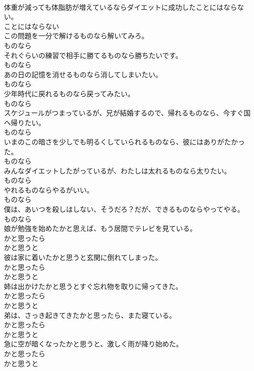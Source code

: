 \documentclass[8pt]{extreport}
\begin{document}
\begin{CJK}{UTF8}{min}
\\	体重が減っても体脂肪が増えているならダイエットに成功したことにはならない。	
\\	ことにはならない	
\\	この問題を一分で解けるものなら解いてみろ。	
\\	ものなら	
\\	それぐらいの練習で相手に勝てるものなら勝ちたいです。	
\\	ものなら	
\\	あの日の記憶を消せるものなら消してしまいたい。	
\\	ものなら	
\\	少年時代に戻れるものなら戻ってみたい。	
\\	ものなら	
\\	スケジュールがつまっているが、兄が結婚するので、帰れるものなら、今すぐ国へ帰りたい。	
\\	ものなら	
\\	いまのこの暗さを少しでも明るくしていられるものなら、彼にはありがたかった。	
\\	ものなら	
\\	みんなダイエットしたがっているが、わたしは太れるものなら太りたい。	
\\	ものなら	
\\	やれるものならやるがいい。	
\\	ものなら	
\\	僕は、あいつを殺しはしない、そうだろ？だが、できるものならやってやる。	
\\	ものなら	
\\	娘が勉強を始めたかと思えば、もう居間でテレビを見ている。	
\\	かと思ったら 
\\	かと思うと	
\\	彼は家に着いたかと思うと玄関に倒れてしまった。	
\\	かと思ったら 
\\	かと思うと	
\\	姉は出かけたかと思うとすぐ忘れ物を取りに帰ってきた。	
\\	かと思ったら 
\\	かと思うと	
\\	弟は、さっき起きてきたかと思ったら、また寝ている。	
\\	かと思ったら 
\\	かと思うと	
\\	急に空が暗くなったかと思うと、激しく雨が降り始めた。	
\\	かと思ったら 
\\	かと思うと	

\end{CJK}
\end{document}

